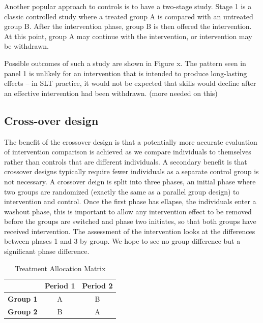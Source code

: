 \documentclass[]{book}
\begin{document}
Another popular approach to controls is to have a two-stage study. Stage 1 is a classic controlled study where a treated group A is compared with an untreated group B. After the intervention phase, group B is then offered the intervention. At this point, group A may continue with the intervention, or intervention may be withdrawn.

Possible outcomes of such a study are shown in Figure x. The pattern seen in panel 1 is unlikely for an intervention that is intended to produce long-lasting effects -- in SLT practice, it would not be expected that skills would decline after an effective intervention had been withdrawn.
(more needed on this)

\hypertarget{cross-over-design}{%
\subsection{Cross-over design}\label{cross-over-design}}

The benefit of the crossover design is that a potentially more accurate evaluation of intervention comparison is achieved as we compare individuals to themselves rather than controls that are different individuals. A secondary benefit is that crossover designs typically require fewer individuals as a separate control group is not necessary.
A crossover deign is split into three phases, an initial phase where two groups are randomized (exactly the same as a parallel group design) to intervention and control. Once the first phase has ellapse, the individuals enter a washout phase, this is important to allow any intervention effect to be removed before the groups are switched and phase two initiates, so that both groups have received intervention. The assessment of the intervention looks at the differences between phases 1 and 3 by group. We hope to see no group difference but a significant phase difference.

\begin{table}[t]

\caption{\label{tab:crossovertable}Treatment Allocation Matrix}
\centering
\begin{tabular}{>{\bfseries}lcc}
\toprule
  & Period 1 & Period 2\\
\midrule
\rowcolor{gray!6}  Group 1 & A & B\\
Group 2 & B & A\\
\bottomrule
\end{tabular}
\end{table}
\end{document}
